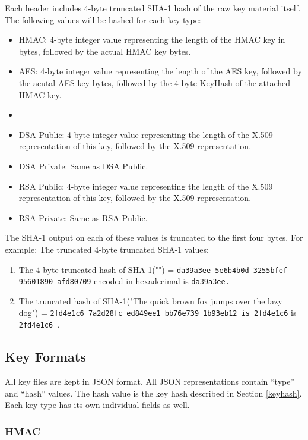 \documentclass{llncs}
\begin{document}
Each header includes 4-byte truncated SHA-1 hash of the raw key
material itself. The following values will be hashed for each key type:
\begin{itemize}
  \item HMAC: 4-byte integer value representing the length of the HMAC key in
  bytes, followed by the actual HMAC key bytes.
  \item AES: 4-byte integer value representing the length of the AES key,
  followed by the acutal AES key bytes, followed by the 4-byte KeyHash of the
  attached HMAC key.
  \item \item DSA Public: 4-byte integer value representing the length of the X.509
  representation of this key, followed by the X.509 representation.
  \item DSA Private: Same as DSA Public.
  \item RSA Public: 4-byte integer value representing the length of the X.509
  representation of this key, followed by the X.509 representation.
  \item RSA Private: Same as RSA Public. 
\end{itemize}

The SHA-1 output on each of these values is truncated to the first four bytes.
For example: The truncated 4-byte truncated SHA-1 values:
\begin{enumerate}
  \item The 4-byte truncated hash of SHA-1("") = {\tt da39a3ee 5e6b4b0d 3255bfef
  95601890 afd80709} encoded in hexadecimal is {\tt da39a3ee.}
  \item The truncated hash of SHA-1("The quick brown fox jumps over the lazy
  dog") = {\tt 2fd4e1c6 7a2d28fc ed849ee1 bb76e739 1b93eb12 is 2fd4e1c6} is
  {\tt 2fd4e1c6 }.
\end{enumerate}

\subsection{Key Formats}\label{formats}

All key files are kept in JSON format. All JSON representations contain
``type'' and ``hash'' values. The hash value is the key hash described in
Section \ref{keyhash}. Each key type has its own individual fields as well.

\subsubsection{HMAC}
\end{document}
